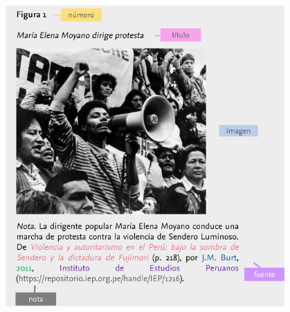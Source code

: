 \documentclass[
11pt, %
]{beamer}
\begin{document}
\begin{frame}
\begin{columns}[c]
\begin{column}{0.5\textwidth}
		\end{column}
		\begin{column}{0.5\textwidth} %
			\begin{figure}
				\centering
				\includegraphics[width=1\linewidth]{images/screenshot010}
			\end{figure}

		\end{column}
	\end{columns}

\end{frame}
\end{document}
